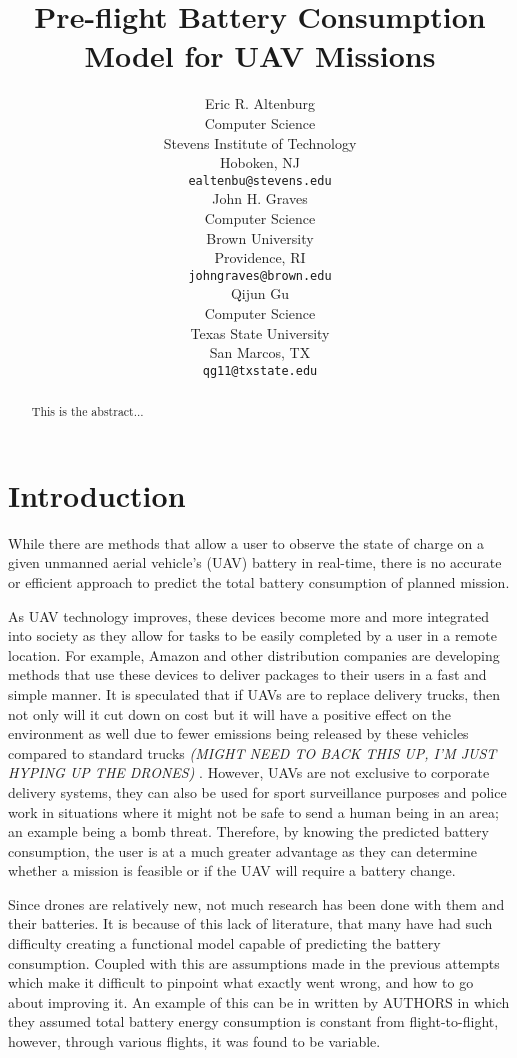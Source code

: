 \documentclass{article}
\title{Pre-flight Battery Consumption Model for UAV Missions}
\author{
  Eric R. Altenburg\\
  Computer Science\\
  Stevens Institute of Technology\\
  Hoboken, NJ \\
  \texttt{ealtenbu@stevens.edu}\\
   \And
  John H. Graves\\
  Computer Science\\
  Brown University\\
  Providence, RI \\
  \texttt{john\textunderscore graves@brown.edu} \\
  \And
  Qijun Gu\\
  Computer Science\\
  Texas State University\\
  San Marcos, TX \\
  \texttt{qg11@txstate.edu}\\
}
\begin{document}
\maketitle

\begin{abstract}
This is the abstract...
\end{abstract}




\section{Introduction}
While there are methods that allow a user to observe the state of charge on a given unmanned aerial vehicle’s (UAV) battery in real-time, there is no accurate or efficient approach to predict the total battery consumption of planned mission.\par

As UAV technology improves, these devices become more and more integrated into society as they allow for tasks to be easily completed by a user in a remote location. For example, Amazon and other distribution companies are developing methods that use these devices to deliver packages to their users in a fast and simple manner. It is speculated that if UAVs are to replace delivery trucks, then not only will it cut down on cost but it will have a positive effect on the environment as well due to fewer emissions being released by these vehicles compared to standard trucks 
{\textit {(MIGHT NEED TO BACK THIS UP, I’M JUST HYPING UP THE DRONES)}}
. However, UAVs are not exclusive to corporate delivery systems, they can also be used for sport surveillance purposes and police work in situations where it might not be safe to send a human being in an area; an example being a bomb threat. Therefore, by knowing the predicted battery consumption, the user is at a much greater advantage as they can determine whether a mission is feasible or if the UAV will require a battery change.\par

Since drones are relatively new, not much research has been done with them and their batteries. It is because of this lack of literature, that many have had such difficulty creating a functional model capable of predicting the battery consumption. Coupled with this are assumptions made in the previous attempts which make it difficult to pinpoint what exactly went wrong, and how to go about improving it. An example of this can be in \cite{8662581} written by AUTHORS in which they assumed total battery energy consumption is constant from flight-to-flight, however, through various flights, it was found to be variable. 
\end{document}

